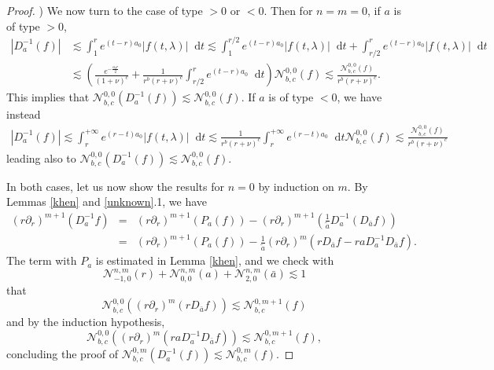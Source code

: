 \documentclass[11 pt]{amsart}
\theoremstyle{definition}
\theoremstyle{remark}
\numberwithin{equation}{section}
\newcommand{\dd}{\mathop{}\!\mathrm{d}}
\begin{document}
\begin{proof}
) We now turn to the case of type $> 0$ or $<0$. Then for $n = m = 0$, if $a$ is of type $>0$,
\begin{align*}
| D_a^{- 1} (f) | & \lesssim \int_1^r e^{(t - r) a_0} | f (t, \lambda) |
   \dd t \lesssim  \int_1^{r / 2} e^{(t - r) a_0} | f (t, \lambda) |\dd t +
    \int_{r / 2}^r e^{(t - r) a_0} | f (t, \lambda) |\dd t\\
    & \lesssim  \left( \frac{e^{- \frac{a_0 r}{2}}}{(1 + \nu)^c} +
    \frac{1}{r^b (r + \nu)^c} \int_{r / 2}^r e^{(t - r) a_0}\dd t \right)
    \mathcal{N}_{b, c}^{0, 0} (f) \lesssim  \frac{\mathcal{N}_{b, c}^{0, 0} (f)}{r^b (r + \nu)^c} .
\end{align*}
  This implies that $\mathcal{N}_{b, c}^{0, 0} (D_a^{- 1} (f)) \lesssim
  \mathcal{N}_{b, c}^{0, 0} (f)$. If $a$ is of type $< 0$, we have instead
  \begin{eqnarray*}
    | D_a^{- 1} (f) | \lesssim \int_r^{+ \infty} e^{(r - t) a_0} | f (t,
    \lambda) |\dd t \lesssim  \frac{1}{r^b (r + \nu)^c} \int_r^{+ \infty} e^{(r - t) a_0}
   \dd t\mathcal{N}_{b, c}^{0, 0} (f) \lesssim \frac{\mathcal{N}_{b, c}^{0, 0} (f)}{r^b (r + \nu)^c}
  \end{eqnarray*}
  leading also to $\mathcal{N}_{b, c}^{0, 0} (D_a^{- 1} (f)) \lesssim
  \mathcal{N}_{b, c}^{0, 0} (f)$.
  
In both cases, let us now show the results for $n = 0$ by induction on
  $m$. By Lemmas \ref{khen} and \ref{unknown}.1, we have
  \begin{eqnarray*}
    (r \partial_r)^{m + 1} (D_a^{- 1} f) & = & (r \partial_r)^{m + 1} (P_a
    (f)) - (r \partial_r)^{m + 1} \left( \frac{1}{\widetilde{a}} D_a^{- 1}
    (D_{\bar{a}} f) \right)\\
    & = & (r \partial_r)^{m + 1} (P_a (f)) - \frac{1}{\widetilde{a}} (r
    \partial_r)^m (r D_{\bar{a}} f - r a D_a^{- 1} D_{\bar{a}} f) .
  \end{eqnarray*}
  The term with $P_a$ is estimated in Lemma \ref{khen}, and we check with
  \[ \mathcal{N}_{- 1, 0}^{n, m} (r) +\mathcal{N}_{0, 0}^{n, m} (a)
     +\mathcal{N}_{2, 0}^{n, m} (\bar{a}) \lesssim 1 \]
  that
  \[ \mathcal{N}_{b, c}^{0, 0} ((r \partial_r)^m (r D_{\bar{a}} f)) \lesssim
     \mathcal{N}_{b, c}^{0, m + 1} (f) \]
  and by the induction hypothesis,
  \[ \mathcal{N}_{b, c}^{0, 0} ((r \partial_r)^m (r a D_a^{- 1} D_{\bar{a}}
     f)) \lesssim \mathcal{N}_{b, c}^{0, m + 1} (f), \]
  concluding the proof of $\mathcal{N}_{b, c}^{0, m} (D_a^{- 1} (f)) \lesssim
  \mathcal{N}_{b, c}^{0, m} (f)$.
  

\end{proof}
\end{document}
